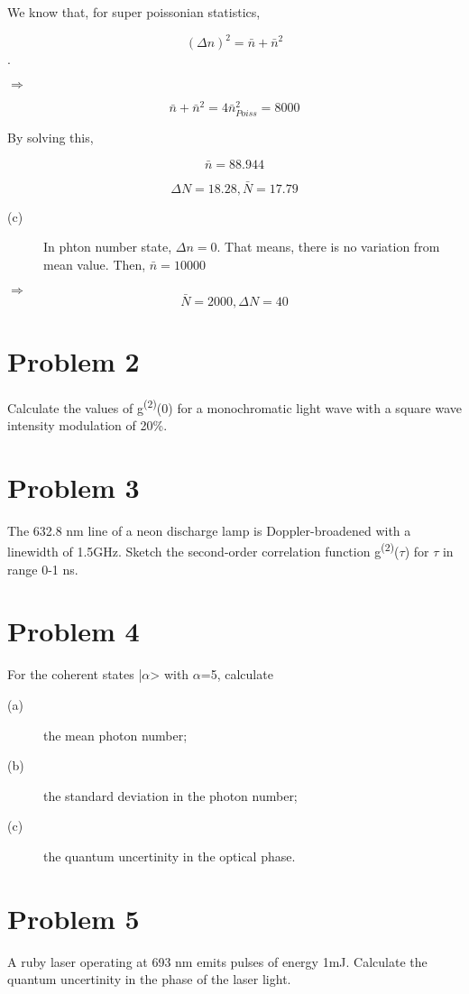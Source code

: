 \documentclass[a4paper,11pt]{article}
\begin{document}
We know that, for super poissonian statistics,

$$(\Delta n)^2 = \bar{n} + \bar{n}^2$$.

\(\Rightarrow\)

$$ \bar{n} + \bar{n}^2 = 4 \bar{n}_{Poiss}^2 = 8000$$

By solving this,

$$\bar{n} =88.944$$


$$\Delta N = 18.28, \bar{N} = 17.79$$

\begin{description}
\item[{(c)}] In phton number state, \(\Delta n=0\). That means, there is no variation from mean value. Then, \(\bar{n} = 10000\)
\end{description}

\(\Rightarrow\)
$$\bar{N} = 2000, \Delta N = 40$$

\section*{Problem 2}
\label{sec:org1643581}
Calculate the values of g\textsuperscript{(2)}(0) for a monochromatic light wave with a square wave intensity modulation of \textpm{} 20\%.

\section*{Problem 3}
\label{sec:org0e78fa2}
The 632.8 nm line of a neon discharge lamp is Doppler-broadened with a linewidth of 1.5GHz. Sketch the second-order correlation function g\textsuperscript{(2)}(\(\tau\)) for \(\tau\) in range 0-1 ns.

\section*{Problem 4}
\label{sec:orgd33c5fb}
For the coherent states |\(\alpha\)> with \(\alpha\)=5, calculate
\begin{description}
\item[{(a)}] the mean photon number;
\item[{(b)}] the standard deviation in the photon number;
\item[{(c)}] the quantum uncertinity in the optical phase.
\end{description}

\section*{Problem 5}
\label{sec:org5c7c02c}
A ruby laser operating at 693 nm emits pulses of energy 1mJ. Calculate the quantum uncertinity in the phase of the laser light.
\end{document}
